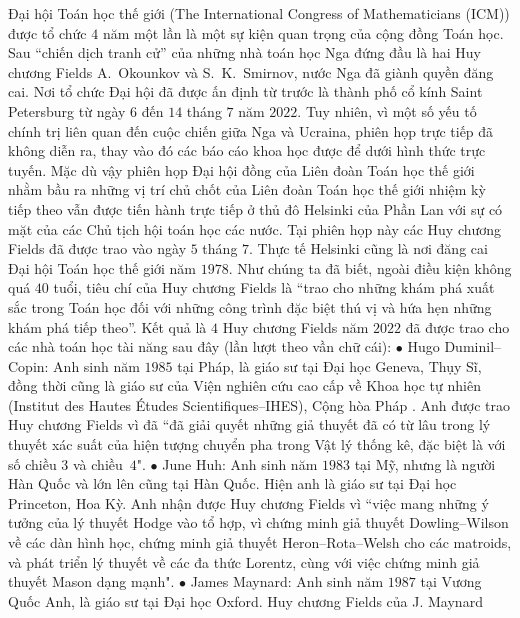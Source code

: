 \begin{multicols}{2}	
	Đại hội Toán học thế giới (The International Congress of Mathematicians (ICM)) được tổ chức $4$ năm một lần là một sự kiện quan trọng của cộng đồng Toán học. Sau ``chiến dịch tranh cử'' của những nhà toán học Nga đứng đầu là hai Huy chương Fields A.~Okounkov và S.~K.~Smirnov, nước Nga đã giành quyền đăng cai. Nơi tổ chức Đại hội đã được ấn định từ trước là thành phố cổ kính Saint Petersburg từ ngày $6$ đến $14$ tháng $7$ năm $2022$. Tuy nhiên, vì một số yếu tố chính trị liên quan đến cuộc chiến giữa Nga và Ucraina, phiên họp trực tiếp đã không diễn ra, thay vào đó các báo cáo khoa học được để  dưới hình thức trực tuyến. Mặc dù vậy phiên họp Đại hội đồng của Liên đoàn Toán học thế giới nhằm bầu ra những vị trí chủ chốt của Liên đoàn Toán học thế giới nhiệm kỳ tiếp theo vẫn được tiến hành trực tiếp ở thủ đô Helsinki của Phần Lan với sự có mặt của các Chủ tịch hội toán học các nước. Tại phiên họp này các Huy chương Fields đã được trao vào ngày $5$ tháng $7$. Thực tế Helsinki cũng là nơi đăng cai Đại hội Toán học thế giới năm $1978$. Như chúng ta đã biết, ngoài điều kiện không quá $40$ tuổi, tiêu chí của Huy chương Fields là ``trao cho những khám phá xuất sắc trong Toán học đối với những công trình đặc biệt thú vị và hứa hẹn những khám phá tiếp theo''. Kết quả là $4$ Huy chương Fields năm $2022$ đã được trao cho các nhà toán học tài năng sau đây (lần lượt theo vần chữ cái): 
	\vskip 0.1cm
	$\bullet$ Hugo Duminil--Copin: Anh sinh năm $1985$ tại Pháp, là giáo sư tại Đại học Geneva, Thụy Sĩ, đồng thời cũng là giáo sư của Viện nghiên cứu cao cấp về Khoa học tự nhiên (Institut des Hautes Études Scientifiques--IHES), Cộng hòa Pháp . Anh được trao Huy chương Fields vì đã ``đã giải quyết những giả thuyết đã có từ lâu trong lý thuyết xác suất của hiện tượng chuyển pha trong Vật lý thống kê, đặc biệt là với số chiều $3$ và chiều~$4$".
	\vskip 0.1cm 
	$\bullet$ June Huh: Anh sinh năm $1983$ tại Mỹ, nhưng là người Hàn Quốc và lớn lên cũng tại Hàn Quốc. Hiện anh là giáo sư tại Đại học Princeton, Hoa Kỳ. Anh nhận được Huy chương Fields vì ``việc mang những ý tưởng của lý thuyết Hodge vào tổ hợp, vì chứng minh giả thuyết Dowling--Wilson về các dàn hình học, chứng minh giả thuyết Heron--Rota--Welsh cho các matroids, và phát triển lý thuyết về các đa thức Lorentz, cùng với việc chứng minh giả thuyết Mason dạng mạnh".
	\vskip 0.1cm	
	$\bullet$ James Maynard: Anh sinh năm $1987$ tại Vương Quốc Anh, là giáo sư tại Đại học Oxford. Huy chương Fields của J. Maynard
	\end{multicols}
